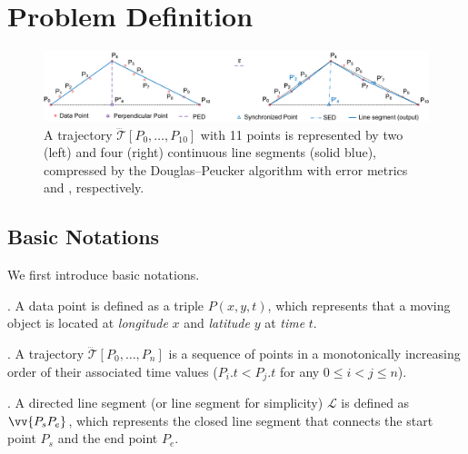 \section{Problem Definition}	%
\label{sec-problem}


\begin{figure}[tb!]
	\centering
	\vspace{-1ex}
	\includegraphics[scale=0.66]{figures/Fig-DP.png}
	\vspace{-2.5ex}
	\caption{\small A trajectory $\dddot{\mathcal{T}}[P_0, \ldots, P_{10}]$  with 11 points is represented by two (left) and four (right) continuous line segments (solid blue), compressed by the Douglas--Peucker algorithm \cite{Douglas:Peucker} with error metrics \ped and \sed, respectively.}
	\vspace{-3ex}
	\label{fig:notations}
\end{figure}



\subsection{Basic Notations}
\label{subsec-notation}

We first introduce basic notations.

. A data point is defined as a triple $P(x, y, t)$, which represents that a moving object is located at {\em longitude} $x$ and {\em latitude} $y$ at {\em time} $t$. 

. A trajectory $\dddot{\mathcal{T}}[P_0, \ldots, P_n]$ is a sequence of points in a monotonically increasing order of their associated time values (\ie $P_i.t < P_j.t$ for any $0\le i<j\le n$). 

. A directed line segment (or line segment for simplicity) $\mathcal{L}$ is defined as $\vv{P_{s}P_{e}}$, which represents the closed line segment that connects the start point $P_s$ and the end point $P_e$.

